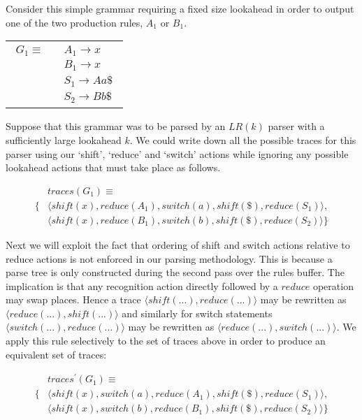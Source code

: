\documentclass[envcountsame,runningheads]{llncs}
\begin{document}
Consider this simple grammar requiring a fixed size lookahead in order to output one of the two production rules, $A_1$ or $B_1$.

\begin{tabular}[t]{l}
\parbox{.3\textwidth}{
\begin{align*}
G_1 \equiv \quad & A_1 \rightarrow x\\
                 & B_1 \rightarrow x\\
                 & S_1 \rightarrow A a \$\\
                 & S_2 \rightarrow B b \$
\end{align*}}
\parbox{.6\textwidth}{}
\end{tabular}

Suppose that this grammar was to be parsed by an $LR(k)$ parser with a sufficiently large lookahead $k$. 
We could write down all the possible traces for this parser using our `shift', `reduce' and `switch' actions while ignoring any possible lookahead actions that must take place as follows.

{\small\parbox{.25\textwidth}{\begin{align*}
&traces(G_1) \equiv \\
\{ & \langle shift(x), reduce(A_1), switch(a), shift(\$), reduce(S_1) \rangle,\\
   & \langle shift(x), reduce(B_1), switch(b), shift(\$), reduce(S_2) \rangle \}
\end{align*}}}

Next we will exploit the fact that ordering of shift and switch actions relative to reduce actions is not enforced in our parsing methodology. This is because a parse tree is only constructed during the second pass over the rules buffer.
The implication is that any recognition action directly followed by a $reduce$ operation may swap places. 
Hence a trace $\langle shift(...), reduce(...) \rangle$ may be rewritten as $\langle reduce(...), shift(...) \rangle$ and similarly for switch statements $\langle switch(...), reduce(...) \rangle$ may be rewritten as $\langle reduce(...), switch(...) \rangle$.
We apply this rule selectively to the set of traces above in order to produce an equivalent set of traces:

{\small\parbox{.3\textwidth}{\begin{align*}
&traces^{\prime}(G_1) \equiv \\
\{ & \langle shift(x), switch(a), reduce(A_1), shift(\$), reduce(S_1) \rangle, \\
   & \langle shift(x), switch(b), reduce(B_1), shift(\$), reduce(S_2) \rangle \}
\end{align*}}}
\end{document}
